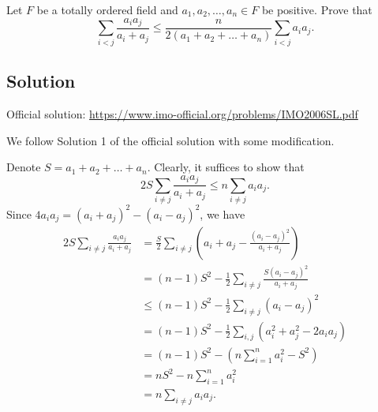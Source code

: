 Let $F$ be a totally ordered field and $a_1, a_2, \ldots, a_n \in F$ be positive.
Prove that
\[ \sum_{i < j} \frac{a_i a_j}{a_i + a_j} \leq \frac{n}{2(a_1 + a_2 + \ldots + a_n)} \sum_{i < j} a_i a_j. \]



\subsection*{Solution}

Official solution: \url{https://www.imo-official.org/problems/IMO2006SL.pdf}

We follow Solution 1 of the official solution with some modification.

Denote $S = a_1 + a_2 + \ldots + a_n$.
Clearly, it suffices to show that
\[ 2S \sum_{i \neq j} \frac{a_i a_j}{a_i + a_j} \leq n \sum_{i \neq j} a_i a_j. \]
Since $4 a_i a_j = (a_i + a_j)^2 - (a_i - a_j)^2$, we have
\begin{align*}
    2S \sum_{i \neq j} \frac{a_i a_j}{a_i + a_j}
    &= \frac{S}{2} \sum_{i \neq j}\left(a_i + a_j - \frac{(a_i - a_j)^2}{a_i + a_j}\right) \\
    &= (n - 1) S^2 - \frac{1}{2} \sum_{i \neq j} \frac{S (a_i - a_j)^2}{a_i + a_j} \\
    &\leq (n - 1) S^2 - \frac{1}{2} \sum_{i \neq j} (a_i - a_j)^2 \\
    &= (n - 1) S^2 - \frac{1}{2} \sum_{i, j} (a_i^2 + a_j^2 - 2 a_i a_j) \\
    &= (n - 1) S^2 - \left(n \sum_{i = 1}^n a_i^2 - S^2\right) \\
    &= nS^2 - n \sum_{i = 1}^n a_i^2 \\
    &= n \sum_{i \neq j} a_i a_j.
\end{align*}

